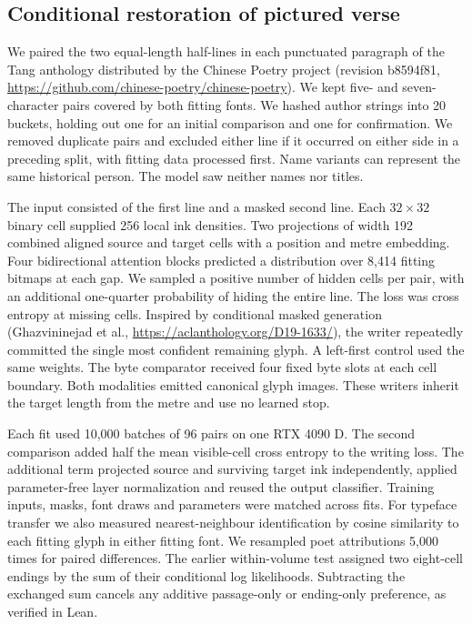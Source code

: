 \subsection*{Conditional restoration of pictured verse}
We paired the two equal-length half-lines in each punctuated paragraph of the Tang anthology distributed by the Chinese Poetry project (revision b8594f81, \url{https://github.com/chinese-poetry/chinese-poetry}). We kept five- and seven-character pairs covered by both fitting fonts. We hashed author strings into 20 buckets, holding out one for an initial comparison and one for confirmation. We removed duplicate pairs and excluded either line if it occurred on either side in a preceding split, with fitting data processed first. Name variants can represent the same historical person. The model saw neither names nor titles.

The input consisted of the first line and a masked second line. Each $32\times32$ binary cell supplied 256 local ink densities. Two projections of width 192 combined aligned source and target cells with a position and metre embedding. Four bidirectional attention blocks predicted a distribution over 8,414 fitting bitmaps at each gap. We sampled a positive number of hidden cells per pair, with an additional one-quarter probability of hiding the entire line. The loss was cross entropy at missing cells. Inspired by conditional masked generation (Ghazvininejad et al., \url{https://aclanthology.org/D19-1633/}), the writer repeatedly committed the single most confident remaining glyph. A left-first control used the same weights. The byte comparator received four fixed byte slots at each cell boundary. Both modalities emitted canonical glyph images. These writers inherit the target length from the metre and use no learned stop.

Each fit used 10,000 batches of 96 pairs on one RTX 4090 D. The second comparison added half the mean visible-cell cross entropy to the writing loss. The additional term projected source and surviving target ink independently, applied parameter-free layer normalization and reused the output classifier. Training inputs, masks, font draws and parameters were matched across fits. For typeface transfer we also measured nearest-neighbour identification by cosine similarity to each fitting glyph in either fitting font. We resampled poet attributions 5,000 times for paired differences. The earlier within-volume test assigned two eight-cell endings by the sum of their conditional log likelihoods. Subtracting the exchanged sum cancels any additive passage-only or ending-only preference, as verified in Lean.
